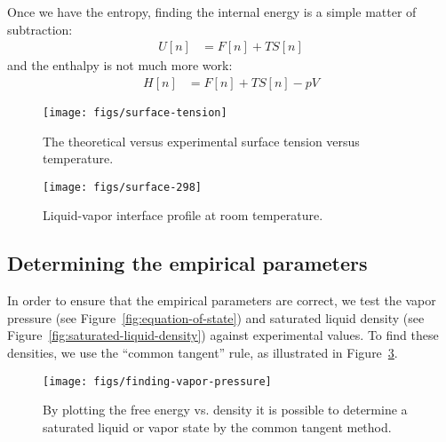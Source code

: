 \documentclass[letterpaper,twocolumn,amsmath,amssymb,prb]{revtex4-1}
\begin{document}
Once we have the entropy, finding the internal energy is a simple
matter of subtraction:
\begin{align}
  U[n] &= F[n] + TS[n]
\end{align}
and the enthalpy is not much more work:
\begin{align}
  H[n] &= F[n] + TS[n] - pV
\end{align}


\begin{figure}
\begin{center}
\texttt{[image: figs/surface-tension]}
\end{center}
\caption{The theoretical versus experimental surface tension
  versus temperature.  }
\label{fig:surface-tension}
\end{figure}

\begin{figure}
\begin{center}
\texttt{[image: figs/surface-298]}
\end{center}
\caption{Liquid-vapor interface profile at room temperature.  }
\label{fig:liquid-vapor-profile}
\end{figure}

\subsection{Determining the empirical parameters}\label{sec:empirical}

In order to ensure that the empirical parameters are correct, we test
the vapor pressure (see Figure~\ref{fig:equation-of-state}) and
saturated liquid density (see
Figure~\ref{fig:saturated-liquid-density}) against experimental
values.  To find these densities, we use the ``common tangent'' rule,
as illustrated in Figure~\ref{fig:homogeneous}.

\begin{figure}
\begin{center}
\texttt{[image: figs/finding-vapor-pressure]}
\end{center}
\caption{By plotting the free energy vs. density it is possible to
  determine a saturated liquid or vapor state by the common tangent
  method.  }
\label{fig:homogeneous}
\end{figure}
\end{document}
